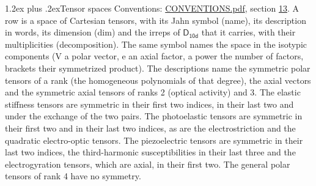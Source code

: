 \documentclass[10pt,a4paper]{article}
\makeatletter
\renewcommand\section{\@startsection{section}{1}{\z@}{-3ex plus -1ex minus -.2ex}%
  {1.2ex plus .2ex}{\normalfont\large\sffamily\bfseries\color{parttitle}}}
\numberwithin{equation}{section}
\newcommand{\grp}[1]{\mathsf{#1}}
\makeatother
\begin{document}
\section{Tensor spaces}\label{s:tensor_spaces}
Conventions: \href{../../CONVENTIONS.pdf}{CONVENTIONS.pdf}, section \href{../../CONVENTIONS.pdf\#conv.13}{13}.
\leavevmode\label{n:head.name}\label{n:head.description}\label{n:head.dim}\label{n:head.decomposition}A row is a space of Cartesian tensors, with its Jahn symbol (name), its description in words, its dimension (dim) and the irreps of $\grp{D_{10d}}$ that it carries, with their multiplicities (decomposition). \label{n:label.jahn}The same symbol names the space in the isotypic components (V a polar vector, e an axial factor, a power the number of factors, brackets their symmetrized product). The descriptions name the symmetric polar tensors of a rank (the homogeneous polynomials of that degree), the axial vectors and the symmetric axial tensors of ranks 2 (optical activity) and 3. The elastic stiffness tensors are symmetric in their first two indices, in their last two and under the exchange of the two pairs. The photoelastic tensors are symmetric in their first two and in their last two indices, as are the electrostriction and the quadratic electro-optic tensors. The piezoelectric tensors are symmetric in their last two indices, the third-harmonic susceptibilities in their last three and the electrogyration tensors, which are axial, in their first two. The general polar tensors of rank 4 have no symmetry.
\end{document}
